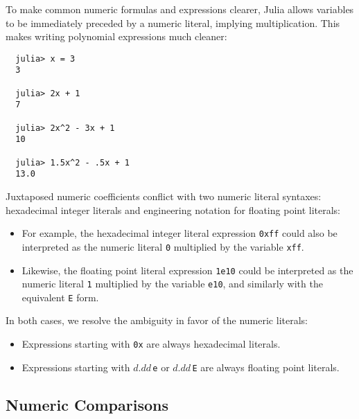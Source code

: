 \documentclass{article}
\begin{document}
To make common numeric formulas and expressions clearer, Julia allows variables to be immediately preceded by a numeric literal, implying multiplication.
This makes writing polynomial expressions much cleaner:
\begin{verbatim}
  julia> x = 3
  3

  julia> 2x + 1
  7

  julia> 2x^2 - 3x + 1
  10

  julia> 1.5x^2 - .5x + 1
  13.0
\end{verbatim}
Juxtaposed numeric coefficients conflict with two numeric literal syntaxes:
hexadecimal integer literals and engineering notation for floating point literals:
\begin{itemize}
\item For example, the hexadecimal integer literal expression \verb|0xff| could also be interpreted as the numeric literal \verb|0| multiplied by the variable \verb|xff|.
\item Likewise, the floating point literal expression \verb|1e10| could be interpreted as the numeric literal \verb|1| multiplied by the variable \verb|e10|, and similarly with the equivalent \verb|E| form.
\end{itemize}
In both cases, we resolve the ambiguity in favor of the numeric literals:
\begin{itemize}
\item Expressions starting with \verb|0x| are always hexadecimal literals.
\item Expressions starting with $d.dd$\,\verb|e| or $d.dd$\,\verb|E| are always floating point literals.
\end{itemize}

\subsection{Numeric Comparisons}
\end{document}
